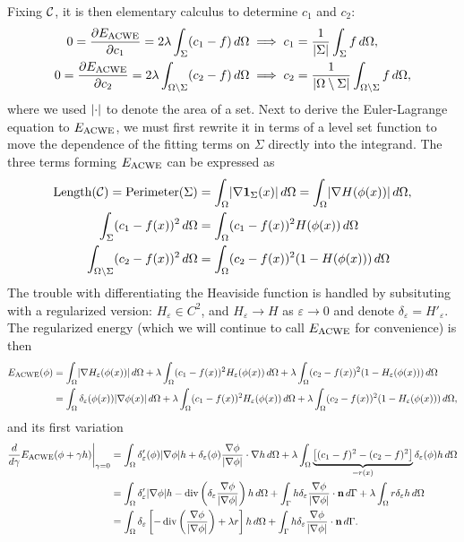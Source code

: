 Fixing $\mathcal{C}$, it is then elementary calculus to determine $c_1$ and $c_2$: 
\begin{align}
0 = \frac{\partial E_\textrm{ACWE}}{\partial c_1}  = 2\lambda \int_{\Sigma} (c_1 - f ) \,d\Omega
&\implies 
c_1 = \frac{1}{\lvert\Sigma\rvert} \int_{\Sigma} f \,d\Omega,
\label{eq:c1}
\\
0 = \frac{\partial E_\textrm{ACWE}}{\partial c_2}  = 2\lambda \int_{\Omega\setminus \Sigma} (c_2 - f )\,d\Omega
&\implies 
c_2 = \frac{1}{\lvert\Omega\setminus\Sigma\rvert} \int_{\Omega\setminus \Sigma} f \,d\Omega,
\label{eq:c2}
\end{align}
where we used $\lvert\cdot\rvert$ to denote the area of a set. Next to derive the Euler-Lagrange equation to $E_\textrm{ACWE}$, we must first rewrite it in terms of a level set function to move the dependence of the fitting terms on $\Sigma$ directly into the integrand. The three terms forming $E_\textrm{ACWE}$ can be expressed as 
\begin{align}
\textrm{Length}(\mathcal{C}) 
= \textrm{Perimeter}(\Sigma) 
&= \int_{\Omega} \lvert\nabla \mathbf{1}_\Sigma(x)\rvert \,d\Omega
= \int_{\Omega} \lvert \nabla H(\phi(x)) \rvert \,d\Omega,
\label{eacwe1}
\\
\int_{\Sigma} (c_1 - f(x) )^2 \, d\Omega 
&= \int_{\Omega} (c_1 - f(x))^2 H(\phi(x)) \, d\Omega
\\
\int_{\Omega\setminus\Sigma} (c_2 - f(x))^2 \,d\Omega 
&=
\int_{\Omega} (c_2 - f(x))^2 (1 - H(\phi(x))) \,d\Omega
\end{align}
The trouble with differentiating the Heaviside function is handled by subsituting with a regularized version: $H_\varepsilon \in C^2$, and $H_\varepsilon \rightarrow H$ as $\varepsilon\rightarrow 0$ and denote $\delta_\varepsilon = H'_\varepsilon$. The regularized energy (which we will continue to call $E_\textrm{ACWE}$ for convenience) is then 
\begin{align*}
E_\textrm{ACWE}(\phi) 
&= \int_{\Omega } \lvert\nabla H_\varepsilon(\phi(x))\rvert \,d\Omega 
+ \lambda\int_{\Omega} (c_1 - f(x))^2 H_\varepsilon(\phi(x)) \, d\Omega 
+ \lambda\int_{\Omega} (c_2 - f(x))^2 (1 - H_\varepsilon(\phi(x))) \,d\Omega
\\
&= \int_{\Omega } \delta_\varepsilon(\phi(x)) \lvert\nabla \phi(x)\rvert \,d\Omega 
+ \lambda\int_{\Omega} (c_1 - f(x))^2 H_\varepsilon(\phi(x)) \, d\Omega 
+ \lambda\int_{\Omega} (c_2 - f(x))^2 (1 - H_\varepsilon(\phi(x))) \,d\Omega,
\end{align*}
and its first variation
\begin{align*}
\frac{d}{d\gamma}E_\textrm{ACWE}(\phi + \gamma h) \bigg\rvert_{\gamma = 0}
&= \int_{\Omega} \delta'_\varepsilon(\phi) \lvert\nabla \phi\rvert h + \delta_\varepsilon(\phi) \frac{\nabla \phi}{\lvert\nabla \phi\rvert} \cdot \nabla h \,d\Omega
+ \lambda\int_{\Omega} \underbrace{\left[(c_1 - f)^2 - (c_2 - f)^2 \right]}_{=r(x)} \delta_\varepsilon(\phi) h \,d\Omega 
\\
&= \int_{\Omega } \delta'_\varepsilon \lvert\nabla \phi\rvert h
- \operatorname{div}\left(\delta_\varepsilon\frac{\nabla \phi}{\lvert\nabla \phi\rvert}  \right)  h
\,d\Omega 
+ \int_\Gamma h\delta_\varepsilon\frac{\nabla \phi}{\lvert\nabla \phi\rvert} \cdot \mathbf{n} \,d\Gamma 
+ \lambda\int_{\Omega} r \delta_\varepsilon h \,d\Omega
\\
&= \int_{\Omega} \delta_\varepsilon\left[ 
- \operatorname{div}\left(\frac{\nabla \phi}{\lvert\nabla \phi\rvert} \right) + \lambda r
\right] h\,d\Omega 
+ \int_\Gamma h\delta_\varepsilon\frac{\nabla \phi}{\lvert\nabla \phi\rvert} \cdot \mathbf{n} \,d\Gamma. 
\end{align*}

